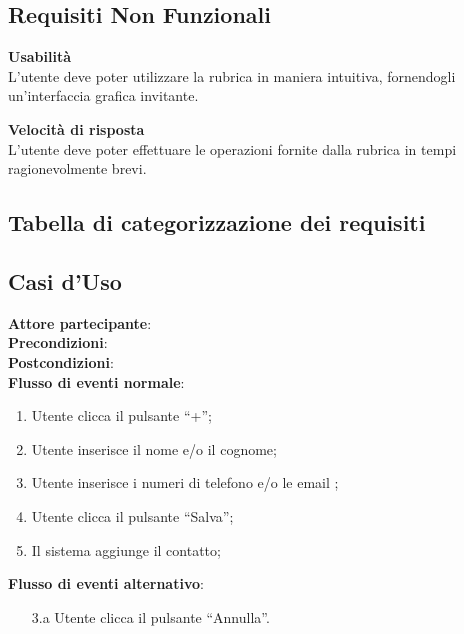 \subsection{Requisiti Non Funzionali}
\newcommand{\FCitem}{\addtocounter{FCcounter}{1}FC-\theFCcounter}
\begin{tcolorbox}[colback=white,colframe=black!80!white,title=\textbf{Vincoli FC}]
	\begin{itemize}[itemsep=2pt, topsep=0pt, label=\textbf{\FCitem}]
		\item \textbf{Usabilità}
		\\L’utente deve poter utilizzare la rubrica in maniera intuitiva,
		fornendogli un’interfaccia grafica invitante.
		
		\item \textbf{Velocità di risposta}
		\\L’utente deve poter effettuare le operazioni fornite dalla rubrica in tempi ragionevolmente brevi.		
	\end{itemize}
\end{tcolorbox}


\subsection{Tabella di categorizzazione dei requisiti}

\newpage
\subsection{Casi d'Uso}
\begin{tcolorbox}[colback=white,colframe=black!80!white,title=\textbf{C0 - Aggiungere contatto}]
\textbf{Attore partecipante}:
\\\textbf{Precondizioni}: 
\\\textbf{Postcondizioni}:
\\\textbf{Flusso di eventi normale}:
\begin{enumerate}[noitemsep, topsep=0pt]
	\item Utente clicca il pulsante “+”;
	\item Utente inserisce il nome e/o il cognome;
	\item Utente inserisce i numeri di telefono e/o le email ;
	\item Utente clicca il pulsante “Salva”;
	\item Il sistema aggiunge il contatto;
\end{enumerate}
\textbf{Flusso di eventi alternativo}:
\begin{itemize}[noitemsep, topsep=0pt]
	\item[3.a] Utente clicca il pulsante “Annulla”.
\end{itemize}
\end{tcolorbox}

